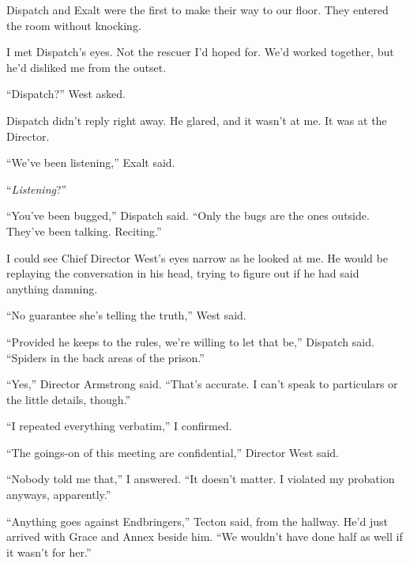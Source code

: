 Dispatch and Exalt were the first to make their way to our floor.  They entered the room without knocking.



I met Dispatch's eyes.  Not the rescuer I'd hoped for.  We'd worked together, but he'd disliked me from the outset.



``Dispatch?''  West asked.



Dispatch didn't reply right away.  He glared, and it wasn't at me.  It was at the Director.



``We've been listening,'' Exalt said.



``\emph{Listening}?''



``You've been bugged,'' Dispatch said.  ``Only the bugs are the ones outside.  They've been talking.  Reciting.''



I could see Chief Director West's eyes narrow as he looked at me.  He would be replaying the conversation in his head, trying to figure out if he had said anything damning.



``No guarantee she's telling the truth,'' West said.



``Provided he keeps to the rules, we're willing to let that be,'' Dispatch said.  ``Spiders in the back areas of the prison.''



``Yes,'' Director Armstrong said.  ``That's accurate.  I can't speak to particulars or the little details, though.''



``I repeated everything verbatim,'' I confirmed.



``The goings-on of this meeting are confidential,'' Director West said.



``Nobody told me that,'' I answered.  ``It doesn't matter.  I violated my probation anyways, apparently.''



``Anything goes against Endbringers,'' Tecton said, from the hallway.  He'd just arrived with Grace and Annex beside him.  ``We wouldn't have done half as well if it wasn't for her.''



